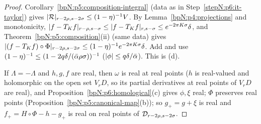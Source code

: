 \begin{proof}
\label{stepN:p6:it-terms} Corollary~\ref{bpN:p5:composition-integral} (data as in Step~\ref{stepN:p6:it-taylor}) gives $\lvert \mathcal R\rvert_{r-2\rho,s-2\sigma}\le(1-\eta)^{-1}V$. By Lemma~\ref{bpN:p4:projections} and monotonicity, $\lvert f-T_Kf\rvert_{r-\rho,s-\sigma}\le\lvert f-T_Kf\rvert_{r,s-\sigma}\le e^{-2\pi K\sigma}\delta$, and Theorem~\ref{bpN:p5:composition}(ii) (same data) gives $\lvert (f-T_Kf)\circ\Phi\rvert_{r-2\rho,s-2\sigma}\le(1-\eta)^{-1}e^{-2\pi K\sigma}\delta$. Add and use $(1-\eta)^{-1}\le(1-2q\delta/(\bar\alpha\rho\sigma))^{-1}$ ($\lvert \phi\rvert\le q\delta/\bar\alpha$). This is (d).

\label{stepN:p6:it-real} If $\Lambda=-\Lambda$ and $h,g,f$ are real, then $\omega$ is real at real points ($h$ is real-valued and holomorphic on the open set $V_rD$, so its partial derivatives at real points of $V_rD$ are real), and Proposition~\ref{bpN:p6:homological}(c) gives $\phi,\xi$ real; $\Phi$ preserves real points (Proposition~\ref{bpN:p5:canonical-map}(b)); so $g_+=g+\xi$ is real and $f_+=H\circ\Phi-h-g_+$ is real on real points of $\mathcal D_{r-2\rho,s-2\sigma}$.
\end{proof}

